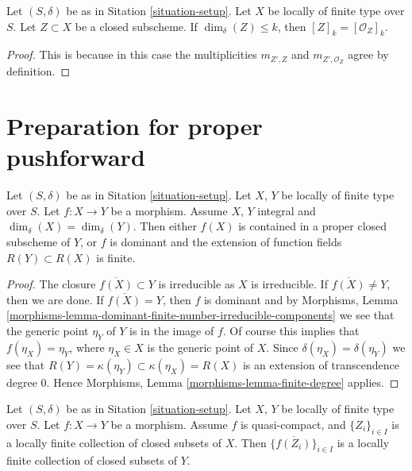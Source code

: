 \begin{lemma}
\label{lemma-cycle-closed-coherent}
Let $(S, \delta)$ be as in Sitation \ref{situation-setup}.
Let $X$ be locally of finite type over $S$.
Let $Z \subset X$ be a closed subscheme.
If $\dim_\delta(Z) \leq k$, then $[Z]_k = [{\mathcal O}_Z]_k$.
\end{lemma}

\begin{proof}
This is because in this case the multiplicities $m_{Z', Z}$ and
$m_{Z', \mathcal{O}_Z}$ agree by definition.
\end{proof}









\section{Preparation for proper pushforward}
\label{section-preparation-pushforward}

\begin{lemma}
\label{lemma-equal-dimension}
Let $(S, \delta)$ be as in Sitation \ref{situation-setup}.
Let $X$, $Y$ be locally of finite type over $S$.
Let $f : X \to Y$ be a morphism.
Assume $X$, $Y$ integral and $\dim_\delta(X) = \dim_\delta(Y)$.
Then either $f(X)$ is contained in a proper closed subscheme
of $Y$, or $f$ is dominant and the extension of function fields
$R(Y) \subset R(X)$ is finite.
\end{lemma}

\begin{proof}
The closure $\overline{f(X)} \subset Y$ is irreducible as $X$
is irreducible. If $\overline{f(X)} \not = Y$, then we are done.
If $\overline{f(X)} = Y$, then $f$ is dominant and by
Morphisms,
Lemma \ref{morphisms-lemma-dominant-finite-number-irreducible-components}
we see that the generic point $\eta_Y$ of $Y$ is in the image of $f$.
Of course this implies that $f(\eta_X) = \eta_Y$, where $\eta_X \in X$
is the generic point of $X$. Since $\delta(\eta_X) = \delta(\eta_Y)$
we see that $R(Y) = \kappa(\eta_Y) \subset \kappa(\eta_X) = R(X)$
is an extension of transcendence degree $0$.
Hence Morphisms, Lemma \ref{morphisms-lemma-finite-degree} applies.
\end{proof}

\begin{lemma}
\label{lemma-quasi-compact-locally-finite}
Let $(S, \delta)$ be as in Sitation \ref{situation-setup}.
Let $X$, $Y$ be locally of finite type over $S$.
Let $f : X \to Y$ be a morphism.
Assume $f$ is quasi-compact, and $\{Z_i\}_{i \in I}$ is a locally
finite collection of closed subsets of $X$.
Then $\{\overline{f(Z_i)}\}_{i \in I}$ is a locally finite
collection of closed subsets of $Y$.
\end{lemma}

